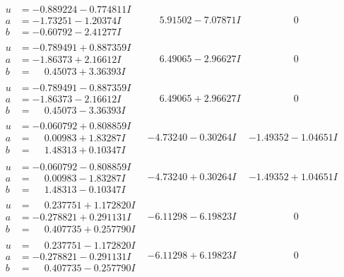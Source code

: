\documentclass[1p]{elsarticle_modified}
\theoremstyle{definition}
\begin{document}
$$\begin{array}{c|c|c}
\begin{aligned}
u &= -0.889224 - 0.774811 I \\
a &= -1.73251 - 1.20374 I \\
b &= -0.60792 - 2.41277 I\end{aligned}
 & \phantom{-}5.91502 - 7.07871 I & \phantom{-0.000000 } 0 \\ \hline\begin{aligned}
u &= -0.789491 + 0.887359 I \\
a &= -1.86373 + 2.16612 I \\
b &= \phantom{-}0.45073 + 3.36393 I\end{aligned}
 & \phantom{-}6.49065 - 2.96627 I & \phantom{-0.000000 } 0 \\ \hline\begin{aligned}
u &= -0.789491 - 0.887359 I \\
a &= -1.86373 - 2.16612 I \\
b &= \phantom{-}0.45073 - 3.36393 I\end{aligned}
 & \phantom{-}6.49065 + 2.96627 I & \phantom{-0.000000 } 0 \\ \hline\begin{aligned}
u &= -0.060792 + 0.808859 I \\
a &= \phantom{-}0.00983 + 1.83287 I \\
b &= \phantom{-}1.48313 + 0.10347 I\end{aligned}
 & -4.73240 - 0.30264 I & -1.49352 - 1.04651 I \\ \hline\begin{aligned}
u &= -0.060792 - 0.808859 I \\
a &= \phantom{-}0.00983 - 1.83287 I \\
b &= \phantom{-}1.48313 - 0.10347 I\end{aligned}
 & -4.73240 + 0.30264 I & -1.49352 + 1.04651 I \\ \hline\begin{aligned}
u &= \phantom{-}0.237751 + 1.172820 I \\
a &= -0.278821 + 0.291131 I \\
b &= \phantom{-}0.407735 + 0.257790 I\end{aligned}
 & -6.11298 - 6.19823 I & \phantom{-0.000000 } 0 \\ \hline\begin{aligned}
u &= \phantom{-}0.237751 - 1.172820 I \\
a &= -0.278821 - 0.291131 I \\
b &= \phantom{-}0.407735 - 0.257790 I\end{aligned}
 & -6.11298 + 6.19823 I & \phantom{-0.000000 } 0 \\ \hline\begin{aligned}

\end{aligned}
\end{array}$$
\end{document}
